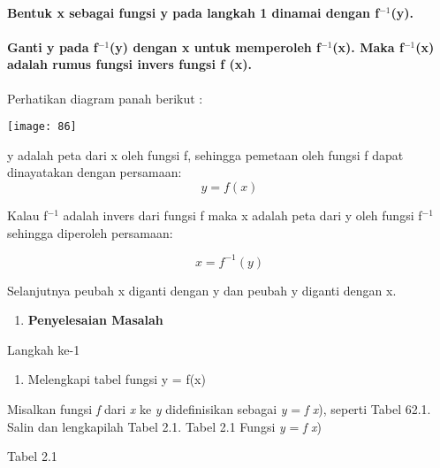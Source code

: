 \documentclass[11pt,fleqn]{book} %
\begin{document}
\paragraph{ Bentuk x sebagai fungsi y pada langkah 1 dinamai dengan f${}^{-1}$(y).}


\paragraph{ Ganti y pada f${}^{-1}$(y) dengan x untuk memperoleh f${}^{-1}$(x). Maka f${}^{-1}$(x) adalah rumus fungsi invers fungsi f (x).}

\noindent \textbf{}

\noindent        Perhatikan diagram panah berikut :

\begin{center}
\noindent \texttt{[image: 86]}
\end{center}

\noindent 

\noindent 

y adalah peta dari x oleh fungsi f, sehingga pemetaan oleh fungsi f dapat dinayatakan dengan persamaan:
\[y=f(x)\] 


Kalau f${}^{-1}$ adalah invers dari fungsi f maka x adalah peta dari y oleh fungsi f${}^{-1}$ sehingga diperoleh persamaan:

\noindent 
\[x=f^{-1} (y)\] 


Selanjutnya peubah x diganti dengan y dan peubah y diganti dengan x. \textbf{}

\noindent 

\begin{enumerate}
\item  \textbf{Penyelesaian Masalah}
\end{enumerate}

\noindent Langkah ke-1

\begin{enumerate}
\item  Melengkapi tabel fungsi y = f(x)
\end{enumerate}

\noindent Misalkan fungsi \textit{f} dari \textit{x} ke \textit{y} didefinisikan sebagai \textit{y} = \textit{f} \textit{x}), seperti Tabel 62.1. Salin dan lengkapilah Tabel 2.1. Tabel 2.1\textbf{ }Fungsi\textbf{ }\textit{y}\textbf{ }=\textbf{ }\textit{f}\textbf{ }\textit{x})

\noindent 

\noindent Tabel 2.1
\end{document}
